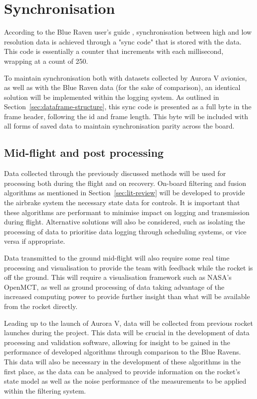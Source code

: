 \section{Synchronisation}\label{sec:synchronisation}
According to the Blue Raven user's guide \cite{adamson_2023}, synchronisation between high and low resolution data is achieved through a "sync code" that is stored with the data. This code is essentially a counter that increments with each millisecond, wrapping at a count of 250. 

To maintain synchronisation both with datasets collected by Aurora V avionics, as well as with the Blue Raven data (for the sake of comparison), an identical solution will be implemented within the logging system. As outlined in Section~\ref{sec:dataframe-structure}, this sync code is presented as a full byte in the frame header, following the id and frame length. This byte will be included with all forms of saved data to maintain synchronisation parity across the board.

\subsection{Mid-flight and post processing}
Data collected through the previously discussed methods will be used for processing both during the flight and on recovery. On-board filtering and fusion algorithms as mentioned in Section~\ref{sec:lit-review} will be developed to provide the airbrake system the necessary state data for controls. It is important that these algorithms are performant to minimise impact on logging and transmission during flight. Alternative solutions will also be considered, such as isolating the processing of data to prioritise data logging through scheduling systems, or vice versa if appropriate. 

Data transmitted to the ground mid-flight will also require some real time processing and visualisation to provide the team with feedback while the rocket is off the ground. This will require a visualisation framework such as NASA's OpenMCT\cite{about}, as well as ground processing of data taking advantage of the increased computing power to provide further insight than what will be available from the rocket directly.

Leading up to the launch of Aurora V, data will be collected from previous rocket launches during the project. This data will be crucial in the development of data processing and validation software, allowing for insight to be gained in the performance of developed algorithms through comparison to the Blue Ravens. This data will also be necessary in the development of these algorithms in the first place, as the data can be analysed to provide information on the rocket's state model as well as the noise performance of the measurements to be applied within the filtering system.

